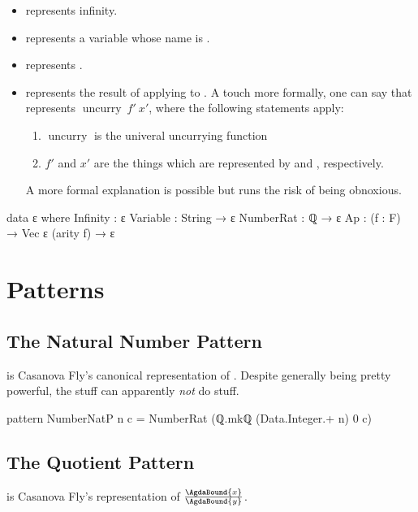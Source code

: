\documentclass{report}
\begin{document}
\begin{itemize}
  \item {} represents infinity.
  \item {}  represents a variable whose name is .
  \item {}  represents .
  \item {}   represents the result of applying  to .  A touch more formally, one can say that    represents \(\operatorname{uncurry}\ f\prime\ x\prime\), where the following statements apply:
  \begin{enumerate}
    \item \(\operatorname{uncurry}\) is the univeral uncurrying function
    \item \(f\prime\) and \(x\prime\) are the things which are represented by  and , respectively.
  \end{enumerate}
  A more formal explanation is possible but runs the risk of being obnoxious.
\end{itemize}

\begin{code}
  data ε where
    Infinity : ε
    Variable : String → ε
    NumberRat : ℚ → ε
    Ap : (f : F) → Vec ε (arity f) → ε
\end{code}

\section{Patterns}

\subsection{The Natural Number Pattern}
   is Casanova Fly's canonical representation of .  Despite generally being pretty powerful, the  stuff can apparently \emph{not} do  stuff.

\begin{code}
  pattern NumberNatP n c = NumberRat (ℚ.mkℚ (Data.Integer.+ n) 0 c)
\end{code}

\subsection{The Quotient Pattern}
    is Casanova Fly's representation of \(\frac{\AgdaBound{x}}{\AgdaBound{y}}\).
\end{document}
